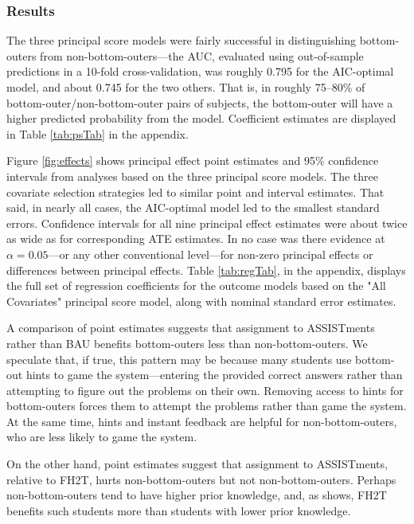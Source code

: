 \documentclass[]{article}
\begin{document}

\subsubsection{Results}

The three principal score models were fairly successful in distinguishing bottom-outers from non-bottom-outers---the AUC, evaluated using out-of-sample predictions in a 10-fold cross-validation, was roughly 0.795 for the AIC-optimal model, and about 0.745 for the two others. That is, in roughly 75--80\% of bottom-outer/non-bottom-outer pairs of subjects, the bottom-outer will have a higher predicted probability from the model.
Coefficient estimates are displayed in Table \ref{tab:psTab} in the appendix.

Figure \ref{fig:effects} shows principal effect point estimates and 95\% confidence intervals from analyses based on the three principal score models.
The three covariate selection strategies led to similar point and interval estimates.
That said, in nearly all cases, the AIC-optimal model led to the smallest standard errors.
Confidence intervals for all nine principal effect estimates were about twice as wide as for corresponding ATE estimates.
In no case was there evidence at $\alpha=0.05$---or any other conventional level---for non-zero principal effects or differences between principal effects.
Table \ref{tab:regTab}, in the appendix, displays the full set of regression coefficients for the outcome models based on the "All Covariates" principal score model, along with nominal standard error estimates.

A comparison of point estimates suggests that assignment to ASSISTments rather than BAU benefits bottom-outers less than non-bottom-outers.
We speculate that, if true, this pattern may be because many students use bottom-out hints to game the system---entering the provided correct answers rather than attempting to figure out the problems on their own.
Removing access to hints for bottom-outers forces them to attempt the problems rather than game the system.
At the same time, hints and instant feedback are helpful for non-bottom-outers, who are less likely to game the system.

On the other hand, point estimates suggest that assignment to ASSISTments, relative to FH2T, hurts non-bottom-outers but not non-bottom-outers.
Perhaps non-bottom-outers tend to have higher prior knowledge, and, as \cite{impactPaper} shows, FH2T benefits such students more than students with lower prior knowledge.
\end{document}

